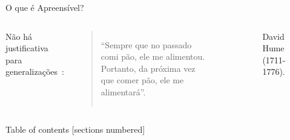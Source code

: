 \documentclass[10pt, professionalfonts]{beamer}
\begin{document}
\begin{frame}{O que é Apreensível?}
 
\begin{columns}[c]
Não há justificativa para generalizações~\cite{Hume2009Tratado}: 
\begin{quotation}
  ``Sempre que no passado comi pão, ele me alimentou. Portanto, da próxima vez que comer pão, ele me alimentará''.
\end{quotation}~\cite{hume2004investigacoes}
  \centering 
  \begin{figure}
    \label{hume}
    \caption{David Hume (1711-1776).}
  \end{figure} 
\end{columns}
\end{frame}

\begin{frame}{Table of contents}
  [sections numbered]
  \tableofcontents[hideallsubsections]
\end{frame}
\end{document}
